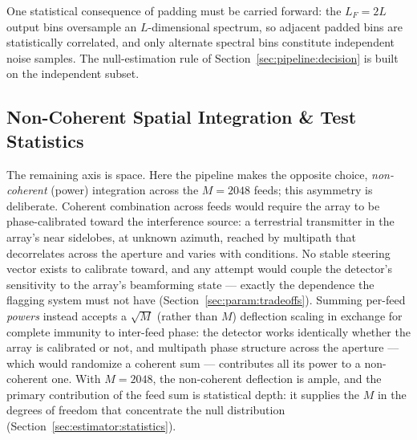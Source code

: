One statistical consequence of padding must be carried forward: the $L_F = 2L$ output bins oversample an $L$-dimensional spectrum, so adjacent padded bins are statistically correlated, and only alternate spectral bins constitute independent noise samples. The null-estimation rule of Section~\ref{sec:pipeline:decision} is built on the independent subset.

\subsection{Non-Coherent Spatial Integration \& Test Statistics}
\label{sec:pipeline:noncoherent}

The remaining axis is space. Here the pipeline makes the opposite choice, \emph{non-coherent} (power) integration across the $M = 2048$ feeds; this asymmetry is deliberate. Coherent combination across feeds would require the array to be phase-calibrated toward the interference source: a terrestrial transmitter in the array's near sidelobes, at unknown azimuth, reached by multipath that decorrelates across the aperture and varies with conditions. No stable steering vector exists to calibrate toward, and any attempt would couple the detector's sensitivity to the array's beamforming state --- exactly the dependence the flagging system must not have (Section~\ref{sec:param:tradeoffs}). Summing per-feed \emph{powers} instead accepts a $\sqrt{M}$ (rather than $M$) deflection scaling in exchange for complete immunity to inter-feed phase: the detector works identically whether the array is calibrated or not, and multipath phase structure across the aperture --- which would randomize a coherent sum --- contributes all its power to a non-coherent one. With $M = 2048$, the non-coherent deflection is ample, and the primary contribution of the feed sum is statistical depth: it supplies the $M$ in the degrees of freedom that concentrate the null distribution (Section~\ref{sec:estimator:statistics}).

